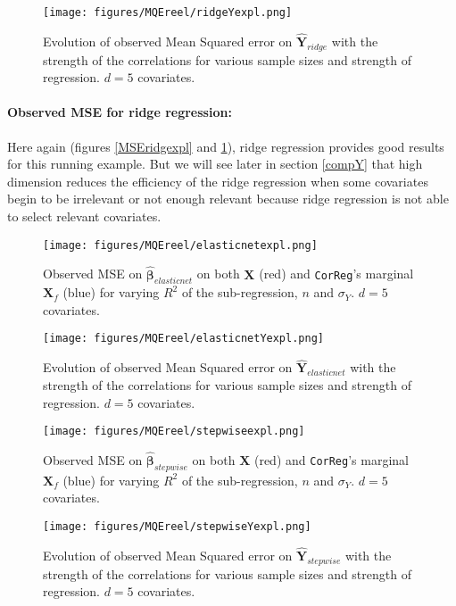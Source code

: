 \documentclass[12pt,a4paper]{report}
\begin{document}
	 \begin{figure}
	 \centering
	  \texttt{[image: figures/MQEreel/ridgeYexpl.png]}
	  \caption{Evolution of observed Mean Squared error on $\hat{\boldsymbol{Y}}_{ridge}$ with the strength of the correlations for various sample sizes and strength of regression. $d=5$ covariates. } \label{MQEridgeYexpl}
	\end{figure}	
	
		\paragraph{Observed MSE for ridge regression:}	
Here again (figures \ref{MSEridgexpl} and \ref{MQEridgeYexpl}), ridge regression provides good results for this running example. But we will see later in section \ref{compY} that high dimension reduces the efficiency of the ridge regression when some covariates begin to be irrelevant or not enough relevant because ridge regression is not able to select relevant covariates. \\


	\begin{figure}[h!]
	\texttt{[image: figures/MQEreel/elasticnetexpl.png]}
	\caption{Observed MSE on $\hat{\boldsymbol{\beta}}_{elasticnet}$ on both $\boldsymbol{X}$ (red) and {\tt CorReg}'s marginal $\boldsymbol{X}_f$ (blue) for varying $R^2$ of the sub-regression, $n$ and $\sigma_Y$. $d=5$ covariates.}\label{MSEelasticnetexpl}
\end{figure} 
	
	 \begin{figure}
	 \centering
	  \texttt{[image: figures/MQEreel/elasticnetYexpl.png]}
	  \caption{Evolution of observed Mean Squared error on $\hat{\boldsymbol{Y}}_{elasticnet}$ with the strength of the correlations for various sample sizes and strength of regression. $d=5$ covariates. } \label{MQEelasticnetYexpl}
	\end{figure}
	\begin{figure}[h!]
	\texttt{[image: figures/MQEreel/stepwiseexpl.png]}\label{MSEstepwiseexpl}
	\caption{Observed MSE on $\hat{\boldsymbol{\beta}}_{stepwise}$ on both $\boldsymbol{X}$ (red) and {\tt CorReg}'s marginal $\boldsymbol{X}_f$ (blue) for varying $R^2$ of the sub-regression, $n$ and $\sigma_Y$. $d=5$ covariates.}
\end{figure} 
	
	 \begin{figure}
	 \centering
	  \texttt{[image: figures/MQEreel/stepwiseYexpl.png]}
	  \caption{Evolution of observed Mean Squared error on $\hat{\boldsymbol{Y}}_{stepwise}$ with the strength of the correlations for various sample sizes and strength of regression. $d=5$ covariates. } \label{MQEstepwiseYexpl}
	\end{figure}
	
\end{document}
